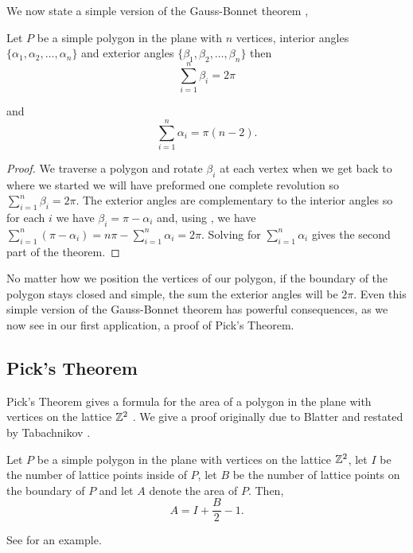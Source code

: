 We now state a simple version of the Gauss-Bonnet theorem \cite{gottlieb_all_1996,polya_elementary_1954},

\begin{theorem}\label{thm:simple-bonnet}
Let $P$ be a simple polygon in the plane with $n$  vertices,
interior angles $\{\alpha_1,\alpha_2,\ldots,\alpha_n\}$
and exterior angles $\{\beta_1,\beta_2,\ldots,\beta_n\}$ then
\begin{equation}\label{eqn:exterior-sum}
		\sum_{i=1}^n\beta_i=2\pi
\end{equation}

and 
\begin{equation}\label{eqn:interior-sum}
		\sum_{i=1}^n\alpha_i=\pi(n-2).
\end{equation}

\end{theorem}


\begin{proof}

	We traverse a polygon and rotate $\beta_i$ at each vertex
	when we get back to where we started we will have preformed 
	one complete revolution so $\sum_{i=1}^n\beta_i=2\pi.$
	The exterior angles are complementary to the interior angles
	so for each $i$ we have $\beta_i=\pi-\alpha_i$  and, using ,
	  we have
	$\sum_{i=1}^n(\pi-\alpha_i)=n\pi -\sum_{i=1}^n\alpha_i=2\pi$. 
	Solving for $\sum_{i=1}^n\alpha_i$ gives the second part of the theorem.
	
\end{proof}

No matter how we position the vertices of our polygon,
if the boundary of the polygon stays closed and simple,
the sum the exterior angles will be $2\pi$.
Even this simple version of the Gauss-Bonnet theorem has powerful
consequences, as we now see in our first application, a proof of Pick's Theorem.



\subsection{Pick's Theorem}
\label{sec:pick}

Pick's Theorem gives a formula for the area of a polygon
in the plane with vertices on the lattice $\mathbb{Z}^2$ \cite{og-pick}.
We give a proof originally due to Blatter \cite{blatter_another_1997}
and restated by Tabachnikov  \cite{tabachnikov_proofs_2014}.

\begin{theorem}\label{thm:pick}
Let $P$ be a simple polygon in the plane with vertices on the lattice $\mathbb{Z}^2$,
let $I$ be the number of lattice points inside of $P$, let $B$ be the number
of lattice points on the boundary of $P$ and let $A$ denote the area of $P$.
Then, 
$$A=I+\frac{B}{2}-1.$$
\end{theorem}
See  for an example.

